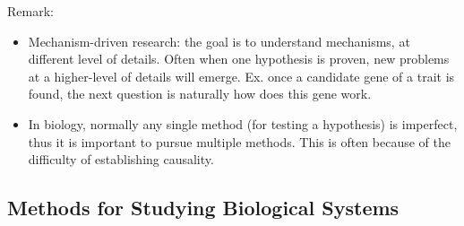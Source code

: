 \documentclass{report}
\begin{document}
Remark: 
\begin{itemize}
\item Mechanism-driven research: the goal is to understand mechanisms, at different level of details. Often when one hypothesis is proven, new problems at a higher-level of details will emerge. Ex. once a candidate gene of a trait is found, the next question is naturally how does this gene work.  
\item In biology, normally any single method (for testing a hypothesis) is imperfect, thus it is important to pursue multiple methods. This is often because of the difficulty of establishing causality. 
\end{itemize}

\subsection{Methods for Studying Biological Systems}
\end{document}
